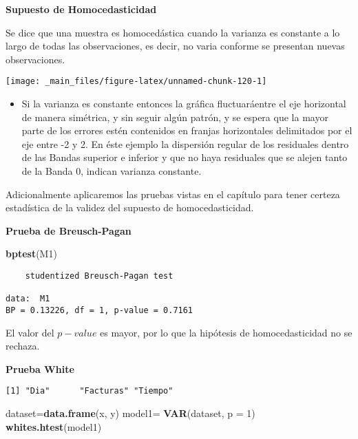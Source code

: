 \documentclass[
  a4paper,
  oneside,
  openany]{book}
\newenvironment{Shaded}{\begin{snugshade}}{\end{snugshade}}
\newcommand{\DataTypeTok}[1]{\textcolor[rgb]{0.13,0.29,0.53}{#1}}
\newcommand{\DecValTok}[1]{\textcolor[rgb]{0.00,0.00,0.81}{#1}}
\newcommand{\KeywordTok}[1]{\textcolor[rgb]{0.13,0.29,0.53}{\textbf{#1}}}
\newcommand{\NormalTok}[1]{#1}
\newcommand{\StringTok}[1]{\textcolor[rgb]{0.31,0.60,0.02}{#1}}
\providecommand{\tightlist}{%
  \setlength{\itemsep}{0pt}\setlength{\parskip}{0pt}}
\begin{document}
\textbf{Supuesto de Homocedasticidad}

Se dice que una muestra es homocedástica cuando la varianza es constante a lo largo de todas las observaciones, es decir, no varia conforme se presentan nuevas observaciones.

\begin{center}\texttt{[image: \_main\_files/figure-latex/unnamed-chunk-120-1]} \end{center}

\begin{itemize}
\tightlist
\item
  Si la varianza es constante entonces la gráfica fluctuaráentre el eje horizontal de manera simétrica, y sin seguir algún patrón, y se espera que la mayor parte de los errores estén contenidos en franjas horizontales delimitados por el eje entre -2 y 2. En éste ejemplo la dispersión regular de los residuales dentro de las Bandas superior e inferior y que no haya residuales que se alejen tanto de la Banda 0, indican varianza constante.
\end{itemize}

Adicionalmente aplicaremos las pruebas vistas en el capítulo para tener certeza estadística de la validez del supuesto de homocedasticidad.

\textbf{Prueba de Breusch-Pagan}

\begin{Shaded}
\begin{Highlighting}[]
\KeywordTok{bptest}\NormalTok{(M1)}
\end{Highlighting}
\end{Shaded}

\begin{verbatim}
    studentized Breusch-Pagan test

data:  M1
BP = 0.13226, df = 1, p-value = 0.7161
\end{verbatim}

El valor del \(p-value\) es mayor, por lo que la hipótesis de homocedasticidad no se rechaza.

\textbf{Prueba White}

\begin{verbatim}
[1] "Dia"      "Facturas" "Tiempo"  
\end{verbatim}

\begin{Shaded}
\begin{Highlighting}[]
\NormalTok{dataset=}\KeywordTok{data.frame}\NormalTok{(x, y)}
\NormalTok{model1=}\StringTok{ }\KeywordTok{VAR}\NormalTok{(dataset, }\DataTypeTok{p =} \DecValTok{1}\NormalTok{)}
\KeywordTok{whites.htest}\NormalTok{(model1)}
\end{Highlighting}
\end{Shaded}
\end{document}
